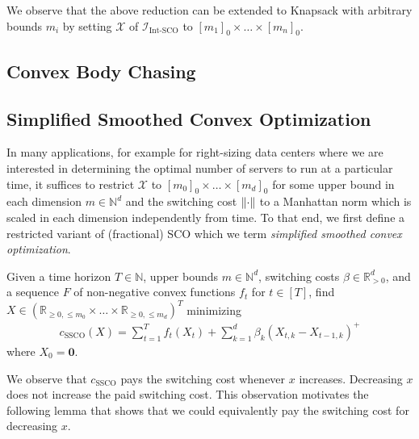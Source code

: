 We observe that the above reduction can be extended to Knapsack with arbitrary bounds $m_i$ by setting $\mathcal{X}$ of $\mathcal{I}_{\text{Int-SCO}}$ to $[m_1]_0 \times \dots \times [m_n]_0$.

\subsection{Convex Body Chasing}

\subsection{Simplified Smoothed Convex Optimization}\label{section:theory:simplified_smoothed_convex_optimization}

In many applications, for example for right-sizing data centers where we are interested in determining the optimal number of servers to run at a particular time, it suffices to restrict $\mathcal{X}$ to $[m_0]_0 \times \dots \times [m_d]_0$ for some upper bound in each dimension $m \in \mathbb{N}^d$ and the switching cost $\lVert\cdot\rVert$ to a Manhattan norm which is scaled in each dimension independently from time. To that end, we first define a restricted variant of (fractional) SCO which we term \emph{simplified smoothed convex optimization}.

\begin{problem}\label{problem:simplified_smoothed_convex_optimization}
Given a time horizon $T \in \mathbb{N}$, upper bounds $m \in \mathbb{N}^d$, switching costs $\beta \in \mathbb{R}_{>0}^d$, and a sequence $F$ of non-negative convex functions $f_t$ for $t \in [T]$, find $X \in (\mathbb{R}_{\geq 0, \leq m_0} \times \dots \times \mathbb{R}_{\geq 0, \leq m_d})^T$ minimizing \begin{align}\label{eq:simplified_smoothed_convex_optimization}
    c_{\text{SSCO}}(X) = \sum_{t=1}^T f_t(X_t) + \sum_{k=1}^d \beta_k (X_{t,k} - X_{t-1,k})^+
\end{align}
where $X_0 = \mathbf{0}$.
\end{problem}

We observe that $c_{\text{SSCO}}$ pays the switching cost whenever $x$ increases. Decreasing $x$ does not increase the paid switching cost. This observation motivates the following lemma that shows that we could equivalently pay the switching cost for decreasing $x$.


